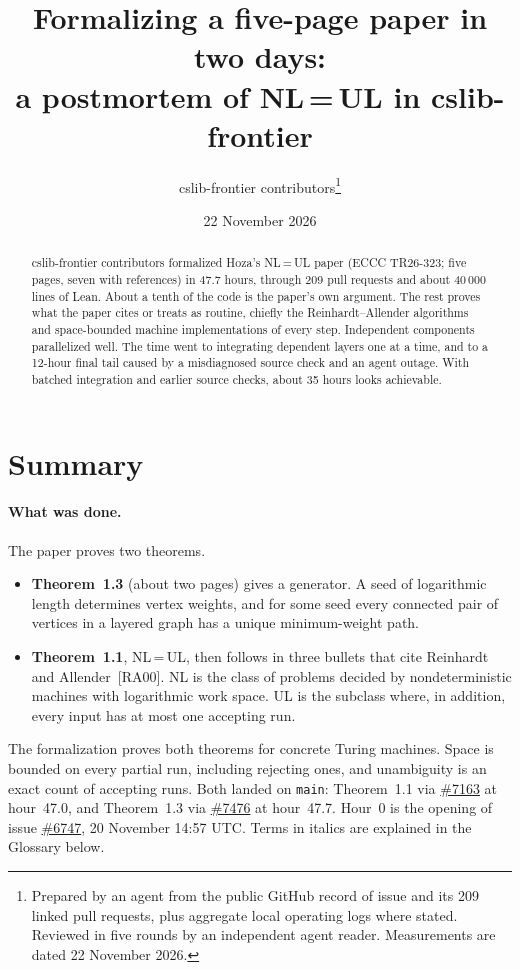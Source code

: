 \documentclass[11pt]{article}
\title{Formalizing a five-page paper in two days:\\
a postmortem of NL\,=\,UL in cslib-frontier}
\author{cslib-frontier contributors\thanks{Prepared by an agent from the public GitHub record of
issue \iss{6747} and its 209 linked pull requests, plus aggregate local operating logs where
stated. Reviewed in five rounds by an independent agent reader. Measurements are dated
22 November 2026.}}
\date{22 November 2026}
\newcommand{\pr}[1]{\href{https://github.com/cslib-community/cslib-frontier/pull/#1}{\##1}}
\newcommand{\iss}[1]{\href{https://github.com/cslib-community/cslib-frontier/issues/#1}{\##1}}
\newcommand{\code}[1]{\texttt{\small #1}}
\begin{document}
\maketitle

\begin{abstract}
\noindent cslib-frontier contributors formalized Hoza's NL\,=\,UL paper (ECCC TR26-323; five pages,
seven with references) in 47.7 hours, through 209 pull requests and about 40\,000 lines of Lean. About a
tenth of the code is the paper's own argument. The rest proves what the paper cites or treats as
routine, chiefly the Reinhardt--Allender algorithms and space-bounded machine implementations of
every step. Independent components parallelized well. The time went to integrating dependent layers
one at a time, and to a 12-hour final tail caused by a misdiagnosed source check and an agent
outage. With batched integration and earlier source checks, about 35 hours looks achievable.
\end{abstract}

\section*{Summary}

\paragraph{What was done.} The paper proves two theorems.
\begin{itemize}
\item \textbf{Theorem~1.3} (about two pages) gives a generator. A seed of logarithmic length
determines vertex weights, and for some seed every connected pair of vertices in a layered graph
has a unique minimum-weight path.
\item \textbf{Theorem~1.1}, NL\,=\,UL, then follows in three bullets that cite Reinhardt and
Allender~[RA00]. NL is the class of problems decided by nondeterministic machines with
logarithmic work space. UL is the subclass where, in addition, every input has at most one
accepting run.
\end{itemize}
The formalization proves both theorems for concrete Turing machines. Space is bounded on every
partial run, including rejecting ones, and unambiguity is an exact count of accepting runs. Both
landed on \code{main}: Theorem~1.1 via \pr{7163} at hour~47.0, and Theorem~1.3 via \pr{7476} at
hour~47.7. Hour~0 is the opening of issue \iss{6747}, 20 November 14:57 UTC. Terms in
italics are explained in the Glossary below.
\end{document}
